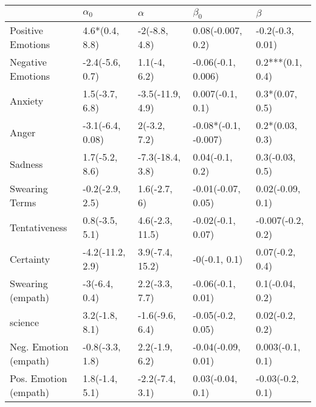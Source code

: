 \begin{tabular}{lllll}
\toprule
{} &        $\alpha_0$ &          $\alpha$ &             $\beta_0$ &            $\beta$ \\
\midrule
Positive Emotions     &    4.6*(0.4, 8.8) &     -2(-8.8, 4.8) &     0.08(-0.007, 0.2) &   -0.2(-0.3, 0.01) \\
Negative Emotions     &   -2.4(-5.6, 0.7) &      1.1(-4, 6.2) &    -0.06(-0.1, 0.006) &   0.2***(0.1, 0.4) \\
Anxiety               &    1.5(-3.7, 6.8) &  -3.5(-11.9, 4.9) &      0.007(-0.1, 0.1) &    0.3*(0.07, 0.5) \\
Anger                 &  -3.1(-6.4, 0.08) &      2(-3.2, 7.2) &  -0.08*(-0.1, -0.007) &    0.2*(0.03, 0.3) \\
Sadness               &    1.7(-5.2, 8.6) &  -7.3(-18.4, 3.8) &       0.04(-0.1, 0.2) &    0.3(-0.03, 0.5) \\
Swearing Terms        &   -0.2(-2.9, 2.5) &      1.6(-2.7, 6) &    -0.01(-0.07, 0.05) &   0.02(-0.09, 0.1) \\
Tentativeness         &    0.8(-3.5, 5.1) &   4.6(-2.3, 11.5) &     -0.02(-0.1, 0.07) &  -0.007(-0.2, 0.2) \\
Certainty             &  -4.2(-11.2, 2.9) &   3.9(-7.4, 15.2) &         -0(-0.1, 0.1) &    0.07(-0.2, 0.4) \\
Swearing (empath)     &     -3(-6.4, 0.4) &    2.2(-3.3, 7.7) &     -0.06(-0.1, 0.01) &    0.1(-0.04, 0.2) \\
science               &    3.2(-1.8, 8.1) &   -1.6(-9.6, 6.4) &     -0.05(-0.2, 0.05) &    0.02(-0.2, 0.2) \\
Neg. Emotion (empath) &   -0.8(-3.3, 1.8) &    2.2(-1.9, 6.2) &    -0.04(-0.09, 0.01) &   0.003(-0.1, 0.1) \\
Pos. Emotion (empath) &    1.8(-1.4, 5.1) &   -2.2(-7.4, 3.1) &      0.03(-0.04, 0.1) &   -0.03(-0.2, 0.1) \\
\bottomrule
\end{tabular}
